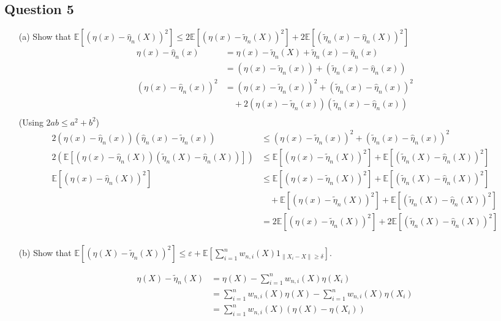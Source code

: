 \documentclass[12pt]{article}
\begin{document}
\subsection*{Question 5}
\begin{enumerate}
\item[(a)]
Show that $\mathbb{E}[(\eta(x) - \hat{\eta}_n(X))^2] \leq 2\mathbb{E}[(\eta(x) - \tilde{\eta}_n(X))^2] + 2\mathbb{E}[(\tilde{\eta}_n(x) - \hat{\eta}_n(X))^2]$ 
\begin{align*}
	\eta(x) - \hat{\eta}_n(x) &= \eta(x) - \tilde{\eta}_n(X) + \tilde{\eta}_n(x) - \hat{\eta}_n(x)\\
	 &= (\eta(x) - \tilde{\eta}_n(x)) + (\tilde{\eta}_n(x) - \hat{\eta}_n(x))\\
	 (\eta(x) - \hat{\eta}_n(x))^2 &= (\eta(x) - \tilde{\eta}_n(x))^2 + (\tilde{\eta}_n(x) - \hat{\eta}_n(x))^2 \\
	 &\quad + 2(\eta(x) - \tilde{\eta}_n(x))(\tilde{\eta}_n(x) - \hat{\eta}_n(x))\\
\end{align*}
(Using $2ab \leq a^2 + b^2$)
\begin{align*}
	 2(\eta(x) - \hat{\eta}_n(x))(\hat{\eta}_n(x) - \tilde{\eta}_n(x)) &\leq (\eta(x) - \tilde{\eta}_n(x))^2 + (\tilde{\eta}_n(x) - \hat{\eta}_n(x))^2 \\
	 2(\mathbb{E}[(\eta(x) - \hat{\eta}_n(X))(\tilde{\eta}_n(X) - \hat{\eta}_n(X))]) &\leq \mathbb{E}[(\eta(x) - \tilde{\eta}_n(X))^2] + \mathbb{E}[(\tilde{\eta}_n(X) - \hat{\eta}_n(X))^2]\\
	 \mathbb{E}[(\eta(x) - \hat{\eta}_n(X))^2] &\leq \mathbb{E}[(\eta(x) - \tilde{\eta}_n(X))^2] + \mathbb{E}[(\tilde{\eta}_n(X) - \hat{\eta}_n(X))^2]\\
	 &\quad+ \mathbb{E}[(\eta(x) - \tilde{\eta}_n(X))^2] + \mathbb{E}[(\tilde{\eta}_n(X) - \hat{\eta}_n(X))^2]\\
	 &= 2\mathbb{E}[(\eta(x) - \tilde{\eta}_n(X))^2] + 2\mathbb{E}[(\tilde{\eta}_n(X) - \hat{\eta}_n(X))^2]\\
	\end{align*}
\item[(b)] Show that $\mathbb{E}[(\eta(X) - \tilde{\eta}_n(X))^2] \leq \varepsilon + \mathbb{E}[\sum_{i=1}^{n} w_{n,i}(X)1_{\|X_i - X\| \geq \delta}]$.

\begin{align*}
\eta(X) - \tilde{\eta}_n(X) &= \eta(X) - \sum_{i=1}^n w_{n,i}(X) \eta(X_i)\\
&= \sum_{i=1}^n w_{n,i}(X) \eta(X) - \sum_{i=1}^n w_{n,i}(X) \eta(X_i)\\
&= \sum_{i=1}^n w_{n,i}(X)(\eta(X) - \eta(X_i))
\end{align*}


\end{enumerate}
\end{document}
